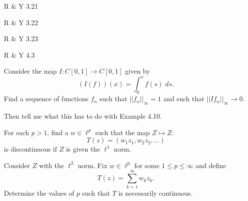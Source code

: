 \documentclass[minion]{homework}
\begin{document}
\begin{aproblems}



\hproblem R \& Y 3.21

\hproblem R \& Y 3.22

\hproblem R \& Y 3.23

\hproblem R \& Y 4.3

\hproblem Consider the map $I:C[0,1]\to C[0,1]$ given by
\[
(I(f))(x) = \int_0^x f(s)\; ds.
\]
Find a sequence of functions $f_n$ such that $||f_n||_{\infty}=1$
and such that $||If_n||_{\infty}\to 0$.  

Then tell me what this has to do with Example 4.10.

\hproblem For each $p>1$, find a $w\in \ell^p$ such that the map
$Z\mapsto Z$:
\[
T(z) = (w_1z_1,w_2z_2,\ldots)
\]
is discontinuous if $Z$ is given the $\ell^1$ norm.

\hproblem Consider $Z$ with the $\ell^2$ norm.  Fix $w\in \ell^p$
for some $1\le p\le \infty$ and define
\[
T(z) = \sum_{k=1}^\infty w_k z_k.
\]
Determine the values of $p$ such that $T$ is necessarily continuous.

\end{aproblems}
\end{document}
